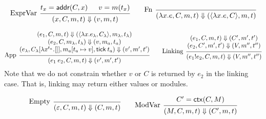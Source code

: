 \documentclass{article}
\theoremstyle{definition}
\newcommand*{\mem}{m}
\newcommand*{\link}[2]{{#1}\mathtt{!}{#2}}
\newcommand*{\addr}{\mathsf{addr}}
\newcommand*{\tick}{\mathsf{tick}}
\newcommand*{\modctx}{\mathsf{ctx}}
\begin{document}
\[
  \begin{prooftree}
    \hypo{t_{x}=\addr(C,x)}
    \hypo{v=\mem(t_{x})}
    \infer[left label=ExprVar]2{
    (x, C, \mem, t)
    \Downarrow
    (v, \mem, t)
    }
  \end{prooftree}\qquad
  \begin{prooftree}
    \infer[left label=Fn]0{
    (\lambda x.e, C, \mem, t)
    \Downarrow
    (\langle\lambda x.e, C\rangle, \mem, t)
    }
  \end{prooftree}
\]

\[
  \begin{prooftree}
    \hypo{
      \begin{matrix}
        (e_{1}, C, \mem, t)
        \Downarrow
        (\langle\lambda x.e_{\lambda}, C_{\lambda}\rangle, \mem_{\lambda}, t_{\lambda}) \\
        (e_{2}, C, \mem_{\lambda}, t_{\lambda})
        \Downarrow
        (v, \mem_{a}, t_{a})                                                            \\
        (e_{\lambda}, C_{\lambda}[\lambda x^{t_{a}}.[]], \mem_{a}[t_{a}\mapsto v], \tick\:t_{a})
        \Downarrow
        (v', \mem',t')
      \end{matrix}
    }
    \infer[left label={App}]1{
    (e_{1}\:e_{2}, C, \mem, t)
    \Downarrow
    (v', \mem',t')
    }
  \end{prooftree}\qquad
  \begin{prooftree}
    \hypo{
      \begin{matrix}
        (e_{1}, C, \mem, t)
        \Downarrow
        (C', \mem', t') \\
        (e_{2}, C', \mem', t')
        \Downarrow
        (V, \mem'', t'')
      \end{matrix}
    }
    \infer[left label=Linking]1{
    (\link{e_{1}}{e_{2}}, C, \mem, t)
    \Downarrow
    (V, \mem'', t'')
    }
  \end{prooftree}
\]
Note that we do not constrain whether $v$ or $C$ is returned by $e_{2}$ in the linking case.
That is, linking may return either values or modules.

\[
  \begin{prooftree}
    \infer[left label=Empty]0{
    (\varepsilon, C, \mem, t)
    \Downarrow
    (C, \mem, t)
    }
  \end{prooftree}\qquad
  \begin{prooftree}
    \hypo{C'=\modctx(C,M)}
    \infer[left label=ModVar]1{
    (M, C, \mem, t)
    \Downarrow
    (C', \mem, t)
    }
  \end{prooftree}
\]
\end{document}
